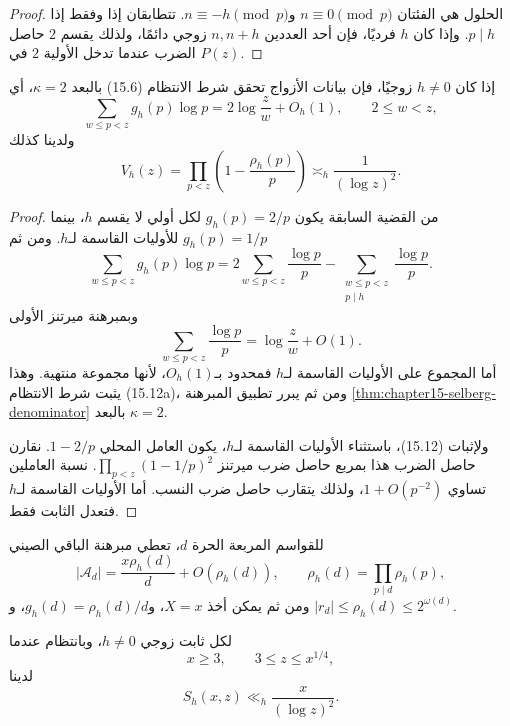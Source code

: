 \begin{proof}
الحلول هي الفئتان \(n\equiv0\pmod p\) و\(n\equiv-h\pmod p\). تتطابقان إذا
وفقط إذا \(p\mid h\). وإذا كان \(h\) فرديًا، فإن أحد العددين \(n,n+h\) زوجي
دائمًا، ولذلك يقسم \(2\) حاصل الضرب عندما تدخل الأولية \(2\) في \(P(z)\).
\end{proof}

\begin{proposition}
\label{prop:chapter15-pair-dimension}
\provedhere
إذا كان \(h\ne0\) زوجيًا، فإن بيانات الأزواج تحقق شرط الانتظام (15.6)
بالبعد \(\kappa=2\)، أي
\[
\sum_{w\le p<z}g_h(p)\log p
=
2\log\frac zw+O_h(1),
\qquad 2\le w<z,
\tag{15.12a}
\]
ولدينا كذلك
\[
V_h(z)
=
\prod_{p<z}\left(1-\frac{\rho_h(p)}p\right)
\asymp_h \frac1{(\log z)^2}.
\tag{15.12}
\]
\end{proposition}

\begin{proof}
من القضية السابقة يكون \(g_h(p)=2/p\) لكل أولي لا يقسم \(h\)، بينما
\(g_h(p)=1/p\) للأوليات القاسمة لـ\(h\). ومن ثم
\[
\sum_{w\le p<z}g_h(p)\log p
=
2\sum_{w\le p<z}\frac{\log p}{p}
-
\sum_{\substack{w\le p<z\\p\mid h}}\frac{\log p}{p}.
\]
وبمبرهنة ميرتنز الأولى
\[
\sum_{w\le p<z}\frac{\log p}{p}
=
\log\frac zw+O(1).
\]
أما المجموع على الأوليات القاسمة لـ\(h\) فمحدود بـ\(O_h(1)\)، لأنها مجموعة
منتهية. وهذا يثبت شرط الانتظام (15.12a)، ومن ثم يبرر تطبيق المبرهنة
\ref{thm:chapter15-selberg-denominator} بالبعد \(\kappa=2\).

ولإثبات (15.12)، باستثناء الأوليات القاسمة لـ\(h\)، يكون العامل المحلي
\(1-2/p\). نقارن حاصل الضرب هذا بمربع حاصل ضرب ميرتنز
\(\prod_{p<z}(1-1/p)^2\). نسبة العاملين تساوي \(1+O(p^{-2})\)، ولذلك يتقارب
حاصل ضرب النسب. أما الأوليات القاسمة لـ\(h\) فتعدل الثابت فقط.
\end{proof}

للقواسم المربعة الحرة \(d\)، تعطي مبرهنة الباقي الصيني
\[
|\mathcal A_d|
=
\frac{x\rho_h(d)}d+O(\rho_h(d)),
\qquad
\rho_h(d)=\prod_{p\mid d}\rho_h(p),
\tag{15.13}
\]
ومن ثم يمكن أخذ \(X=x\)، و\(g_h(d)=\rho_h(d)/d\)، و
\(|r_d|\le \rho_h(d)\le2^{\omega(d)}\).

\begin{theorem}
\label{thm:chapter15-sifted-pairs}
\provedhere
لكل ثابت زوجي \(h\ne0\)، وبانتظام عندما
\[
x\ge3,
\qquad
3\le z\le x^{1/4},
\]
لدينا
\[
S_h(x,z)
\ll_h
\frac{x}{(\log z)^2}.
\tag{15.14}
\]
\end{theorem}

